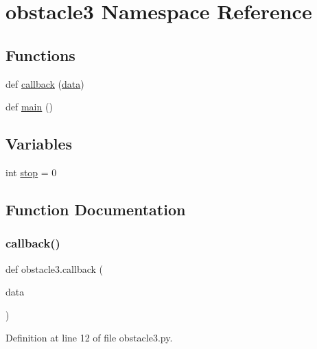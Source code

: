 \hypertarget{namespaceobstacle3}{}\section{obstacle3 Namespace Reference}
\label{namespaceobstacle3}
\subsection*{Functions}
\begin{DoxyCompactItemize}
\item 
def \mbox{\hyperlink{namespaceobstacle3_a314e848d0e7f49d6655d0325387052cd}{callback}} (\mbox{\hyperlink{structdata}{data}})
\item 
def \mbox{\hyperlink{namespaceobstacle3_aba20025cc7f29a8280bafea8c060e53c}{main}} ()
\end{DoxyCompactItemize}
\subsection*{Variables}
\begin{DoxyCompactItemize}
\item 
int \mbox{\hyperlink{namespaceobstacle3_a3527e7f5b88d99da51b161c1816d86c9}{stop}} = 0
\end{DoxyCompactItemize}


\subsection{Function Documentation}
\mbox{\label{namespaceobstacle3_a314e848d0e7f49d6655d0325387052cd}} 
\subsubsection{\texorpdfstring{callback()}{callback()}}
{\footnotesize\ttfamily def obstacle3.\+callback (\begin{DoxyParamCaption}\item[{}]{data }\end{DoxyParamCaption})}



Definition at line 12 of file obstacle3.\+py.

\mbox{\label{namespaceobstacle3_aba20025cc7f29a8280bafea8c060e53c}} 
